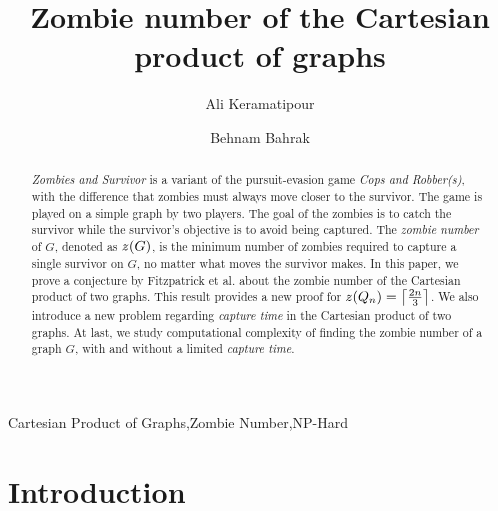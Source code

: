 \documentclass[1p]{elsarticle}
\DeclarePairedDelimiter\ceil{\lceil}{\rceil} \DeclarePairedDelimiter\floor{\lfloor}{\rfloor}
\newcommand{\zn}{\ooalign{$z$\cr\hfil\rule[.5ex]{.2em}{.08ex}\hfil\cr}}
\begin{document}
	
	\begin{frontmatter}
		
		\title{Zombie number of the Cartesian product of graphs}
		
		
		\author{Ali Keramatipour}
		
		\author{Behnam Bahrak}
		
		\address{School of Electrical and Computer Engineering, College of Engineering, University of Tehran, Tehran, Iran}
		
		\begin{abstract}
		{\it Zombies and Survivor} is a variant of the pursuit-evasion game {\it Cops and Robber(s)}, with the
		difference that zombies must always move closer to the survivor. The game is played on a simple graph by two
		players. The goal of the zombies is to catch the survivor while the survivor's objective is to avoid being
		captured. The {\it zombie number} of $G$, denoted as $\zn(G)$, is the minimum number of zombies required to
		capture a single survivor on $G$, no matter what moves the survivor makes. In this paper, we prove a conjecture
		by Fitzpatrick et al.\cite{Fitz16} about the zombie number of the Cartesian product of two graphs. This
		result provides a new proof for $\zn(Q_n) = \ceil*{\frac{2n}{3}}$. We also introduce a new problem regarding
		{\it capture time} in the Cartesian product of two graphs. At last, we study computational complexity of finding
		the zombie number of a graph $G$, with and without a limited {\it capture time}.
		\end{abstract}
		
		\begin{keyword}
			Cartesian Product of Graphs\sep Zombie Number\sep NP-Hard
		\end{keyword}
		
	\end{frontmatter}
	
\section{Introduction}\label{section-introduction}
\end{document}
